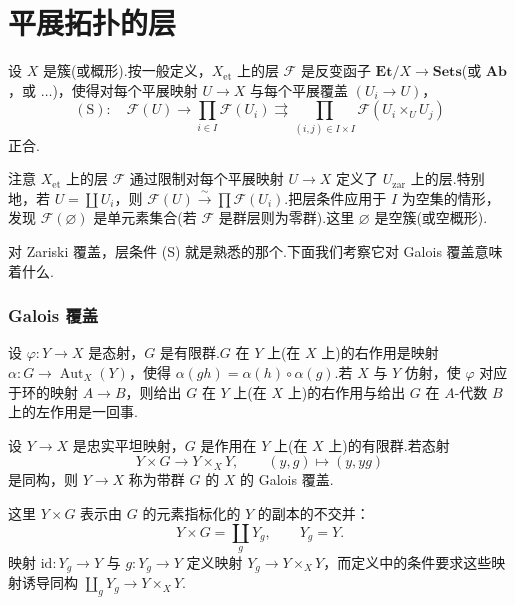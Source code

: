 ﻿%
\chapter{平展拓扑的层}\label{sec:6}

设 $X$ 是簇(或概形).按一般定义，$X_{\mathrm{et}}$ 上的层 $\mathcal{F}$ 是反变函子 $\mathbf{Et}/X \to \mathbf{Sets}$(或 $\mathbf{Ab}$，或 $\ldots$)，使得对每个平展映射 $U \to X$ 与每个平展覆盖 $(U_i \to U)$，
\[
(\mathrm{S}) \colon \quad \mathcal{F}(U) \to \prod_{i \in I} \mathcal{F}(U_i) \rightrightarrows \prod_{(i, j) \in I \times I} \mathcal{F}(U_i \times_{U} U_j)
\]
正合.

注意 $X_{\mathrm{et}}$ 上的层 $\mathcal{F}$ 通过限制对每个平展映射 $U \to X$ 定义了 $U_{\mathrm{zar}}$ 上的层.特别地，若 $U = \coprod U_i$，则 $\mathcal{F}(U) \xrightarrow{\sim} \prod \mathcal{F}(U_i)$.把层条件应用于 $I$ 为空集的情形，发现 $\mathcal{F}(\varnothing)$ 是单元素集合(若 $\mathcal{F}$ 是群层则为零群).这里 $\varnothing$ 是空簇(或空概形).

对 Zariski 覆盖，层条件 (S) 就是熟悉的那个.下面我们考察它对 Galois 覆盖意味着什么.

\subsection*{Galois 覆盖}

设 $\varphi \colon Y \to X$ 是态射，$G$ 是有限群.$G$ 在 $Y$ 上(在 $X$ 上)的右作用是映射 $\alpha \colon G \to \operatorname{Aut}_X(Y)$，使得 $\alpha(gh) = \alpha(h) \circ \alpha(g)$.若 $X$ 与 $Y$ 仿射，使 $\varphi$ 对应于环的映射 $A \to B$，则给出 $G$ 在 $Y$ 上(在 $X$ 上)的右作用与给出 $G$ 在 $A$-代数 $B$ 上的左作用是一回事.

\begin{definition}\label{def:6.1}
设 $Y \to X$ 是忠实平坦映射，$G$ 是作用在 $Y$ 上(在 $X$ 上)的有限群.若态射
\[
Y \times G \to Y \times_{X} Y, \qquad (y, g) \mapsto (y, yg)
\]
是同构，则 $Y \to X$ 称为带群 $G$ 的 $X$ 的 Galois 覆盖.
\end{definition}

这里 $Y \times G$ 表示由 $G$ 的元素指标化的 $Y$ 的副本的不交并：
\[
Y \times G = \coprod_{g} Y_g, \qquad Y_g = Y.
\]
映射 $\mathrm{id} \colon Y_g \to Y$ 与 $g \colon Y_g \to Y$ 定义映射 $Y_g \to Y \times_{X} Y$，而定义中的条件要求这些映射诱导同构 $\coprod_{g} Y_g \to Y \times_{X} Y$.


